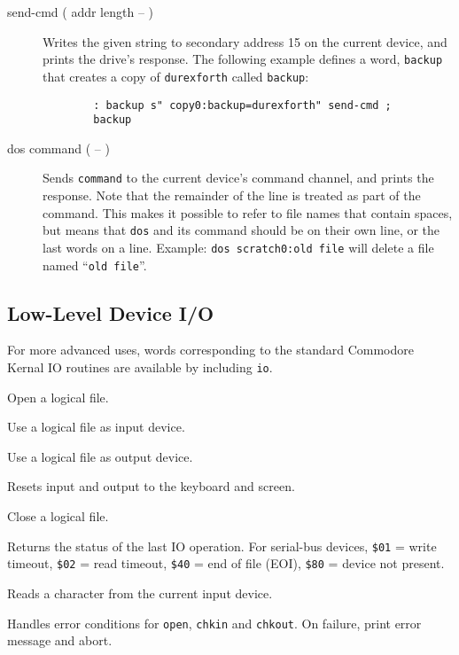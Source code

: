 \begin{description}
    \item[send-cmd ( addr length -- )] Writes the given string to secondary address 15 on the current device, and prints the drive's response. The following example defines a word, \texttt{backup} that creates a copy of \texttt{durexforth} called \texttt{backup}:
    \begin{verbatim}
        : backup s" copy0:backup=durexforth" send-cmd ;
        backup
    \end{verbatim}

    \item[dos command ( -- )] Sends \texttt{command} to the current device's command channel, and prints the response. Note that the remainder of the line is treated as part of the command. This makes it possible to refer to file names that contain spaces, but means that \texttt{dos} and its command should be on their own line, or the last words on a line. Example: \texttt{dos scratch0:old file} will delete a file named ``\texttt{old file}''.
\end{description}

\subsection{Low-Level Device I/O}

For more advanced uses, words corresponding to the standard Commodore Kernal IO routines are available by including \texttt{io}.

\begin{description}
    \item[open ( filenameptr filenamelength file\# secondary-addr -- ioresult )] Open a logical file.
    \item[chkin ( file\# -- ioresult )] Use a logical file as input device.
    \item[chkout ( file\# -- ioresult )] Use a logical file as output device.
    \item[clrchn ( -- )] Resets input and output to the keyboard and screen.
    \item[close ( file\# -- )] Close a logical file.
    \item[readst ( -- status )] Returns the status of the last IO operation. For serial-bus devices, \texttt{\$01} = write timeout, \texttt{\$02} = read timeout, \texttt{\$40} = end of file (EOI), \texttt{\$80} = device not present.
    \item[chrin ( -- char)] Reads a character from the current input device.
    \item[ioabort ( ioresult -- )] Handles error conditions for \texttt{open}, \texttt{chkin} and \texttt{chkout}. On failure, print error message and abort.
\end{description}

